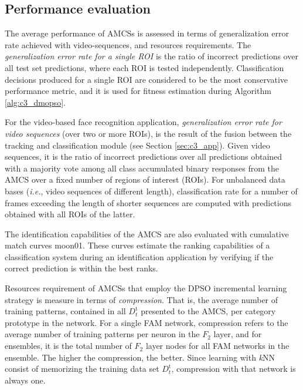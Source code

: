 \subsection{Performance evaluation}
\label{sec:c3_indicator}

The average performance of AMCSs is assessed in terms of generalization error rate achieved with video-sequences, and resources requirements.
The \emph{generalization error rate for a single ROI} is the ratio of incorrect predictions over all test set predictions, where each ROI is tested independently.
Classification decisions produced for a single ROI are considered to be the most conservative performance metric, and it is used for fitness estimation during Algorithm \ref{alg:c3_dmopso}.

For the video-based face recognition application, \emph{generalization error rate for video sequences} (over two or more ROIs), is the result of the fusion between the tracking and classification module (see Section \ref{sec:c3_app}).
Given video sequences, it is the ratio of incorrect predictions over all predictions obtained with a majority vote among all class accumulated binary responses from the AMCS over a fixed number of regions of interest (ROIs).
For unbalanced data bases (\emph{i.e.}, video sequences of different length), classification rate for a number of frames exceeding the length of shorter sequences are computed with predictions obtained with all ROIs of the latter. 

The identification capabilities of the AMCS are also evaluated with cumulative match curves {moon01}.
These curves estimate the ranking capabilities of a classification system during an identification application by verifying if the correct prediction is within the best ranks.

Resources requirement of AMCSs that employ the DPSO incremental learning strategy is measure in terms of \emph{compression}.
That is, the average number of training patterns, contained in all $D_t^\text{t}$ presented to the AMCS, per category prototype in the network.
For a single FAM network, compression refers to the average number of training patterns per neuron in the $F_2$ layer, and for ensembles, it is the total number of $F_2$ layer nodes for all FAM networks in the ensemble.
The higher the compression, the better.
Since learning with \textit{k}NN consist of memorizing the training data set $D_t^\text{t}$, compression with that network is always one.

